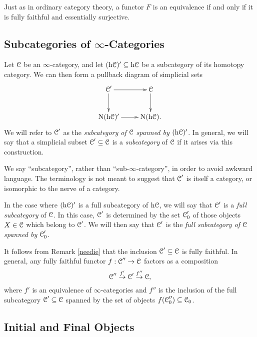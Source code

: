 \begin{Didn't Read}
Just as in ordinary category theory, a functor $F$ is an equivalence if and only if it is fully faithful and essentially surjective.

\subsection{Subcategories of $\infty$-Categories}

Let $\operatorname{\mathcal{C}}$ be an $\infty$-category, and let $(\rm{h} \it{\operatorname{\mathcal{C}}})' \subseteq \rm{h} \it{\operatorname{\mathcal{C}}}$ be a subcategory of its homotopy category. We can then form a pullback diagram of simplicial sets
$$ \xymatrix{ \calC' \ar[r] \ar[d] & \calC \ar[d] \\
\Nerve (\h{\calC})' \ar[r] & \Nerve (\h{ \calC}). }$$
We will refer to $\operatorname{\mathcal{C}}'$ as the {\it subcategory of $\operatorname{\mathcal{C}}$ spanned by $(\rm{h} \it{\operatorname{\mathcal{C}}})'$}. In general, we will say that a simplicial subset $\operatorname{\mathcal{C}}' \subseteq \operatorname{\mathcal{C}}$ is a {\it subcategory} of $\operatorname{\mathcal{C}}$ if it arises via this construction.

\begin{remark}
We say ``subcategory'', rather than ``sub-$\infty$-category'', in
order to avoid awkward language. The terminology is not meant to
suggest that $\operatorname{\mathcal{C}}'$ is itself a category, or isomorphic to the nerve
of a category.
\end{remark}

In the case where $(\rm{h} \it{\operatorname{\mathcal{C}}})'$ is a full subcategory of $\rm{h} \it{\operatorname{\mathcal{C}}}$, we will say that
$\operatorname{\mathcal{C}}'$ is a {\it full subcategory} of $\operatorname{\mathcal{C}}$. In this case, $\operatorname{\mathcal{C}}'$ is determined by the set
$\operatorname{\mathcal{C}}'_0$ of those objects $X \in \operatorname{\mathcal{C}}$ which belong to $\operatorname{\mathcal{C}}'$. We will then say that
$\operatorname{\mathcal{C}}'$ is the {\it full subcategory of $\operatorname{\mathcal{C}}$ spanned by $\operatorname{\mathcal{C}}'_0$}.

It follows from Remark \ref{needie} that
the inclusion $\operatorname{\mathcal{C}}' \subseteq \operatorname{\mathcal{C}}$ is fully faithful. In general, any fully faithful functor $f: \operatorname{\mathcal{C}}'' \rightarrow \operatorname{\mathcal{C}}$ factors as a composition
$$ \operatorname{\mathcal{C}}'' \stackrel{f'}{\rightarrow} \operatorname{\mathcal{C}}' \stackrel{f''}{\rightarrow} \operatorname{\mathcal{C}},$$
where $f'$ is an equivalence of $\infty$-categories and $f''$ is the inclusion of the full subcategory
$\operatorname{\mathcal{C}}' \subseteq \operatorname{\mathcal{C}}$ spanned by the set of objects $f( \operatorname{\mathcal{C}}''_0 ) \subseteq \operatorname{\mathcal{C}}_0$.

\subsection{Initial and Final Objects}


\end{Didn't Read}
